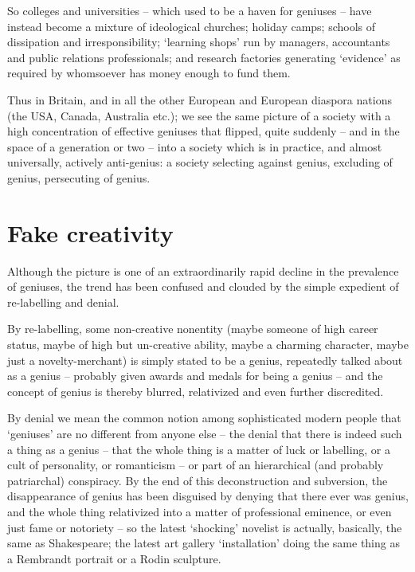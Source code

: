 \documentclass[
]{book}
\begin{document}
So colleges and universities -- which used to be a haven for geniuses -- have instead become a mixture of ideological churches; holiday camps; schools of dissipation and irresponsibility; `learning shops' run by managers, accountants and public relations professionals; and research factories generating `evidence' as required by whomsoever has money enough to fund them.

Thus in Britain, and in all the other European and European diaspora nations (the USA, Canada, Australia etc.); we see the same picture of a society with a high concentration of effective geniuses that flipped, quite suddenly -- and in the space of a generation or two -- into a society which is in practice, and almost universally, actively anti-genius: a society selecting against genius, excluding of genius, persecuting of genius.

\hypertarget{fake-creativity}{%
\section{Fake creativity}\label{fake-creativity}}

Although the picture is one of an extraordinarily rapid decline in the prevalence of geniuses, the trend has been confused and clouded by the simple expedient of re-labelling and denial.

By re-labelling, some non-creative nonentity (maybe someone of high career status, maybe of high but un-creative ability, maybe a charming character, maybe just a novelty-merchant) is simply stated to be a genius, repeatedly talked about as a genius -- probably given awards and medals for being a genius -- and the concept of genius is thereby blurred, relativized and even further discredited.

By denial we mean the common notion among sophisticated modern people that `geniuses' are no different from anyone else -- the denial that there is indeed such a thing as a genius -- that the whole thing is a matter of luck or labelling, or a cult of personality, or romanticism -- or part of an hierarchical (and probably patriarchal) conspiracy. By the end of this deconstruction and subversion, the disappearance of genius has been disguised by denying that there ever was genius, and the whole thing relativized into a matter of professional eminence, or even just fame or notoriety -- so the latest `shocking' novelist is actually, basically, the same as Shakespeare; the latest art gallery `installation' doing the same thing as a Rembrandt portrait or a Rodin sculpture.
\end{document}
